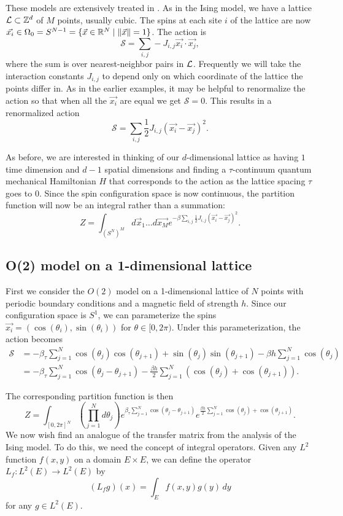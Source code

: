 \documentclass[11pt,reqno]{amsart}
\begin{document}
	These models are extensively treated in \cite{FradkinSusskind78,HamerKogutSusskind79,KogutGaugeSummary}. 
	As in the Ising model, we have a lattice $\mathcal{L} \subset \mathbb{Z}^d$ of $M$ points, usually cubic. 
	The spins at each site $i$ of the lattice are now $\vec{x_i} \in \Omega_0=S^{N-1} = \{\vec{x} \in \mathbb{R}^{N} \mid \|\vec{x}\|=1 \}$. 
	The action is
	\[\mathcal{S}=\sum_{i,j} -J_{i,j}\vec{x_i}\cdot\vec{x_j}, \] where the sum is over nearest-neighbor pairs in $\mathcal{L}$.
	Frequently we will take the interaction constants $J_{i,j}$ to depend only on which coordinate of the lattice the points differ in.
	As in the earlier examples, it may be helpful to renormalize the action so that when all the $\vec{x_i}$ are equal we get $\mathcal{S}=0$. 
	This results in a renormalized action
	\[\mathcal{S}=\sum_{i,j}\frac{1}{2} J_{i,j}(\vec{x_i}-\vec{x_j})^2. \]
	
	As before, we are interested in thinking of our $d$-dimensional lattice as having $1$ time dimension and $d-1$ spatial dimensions and finding a $\tau$-continuum quantum mechanical Hamiltonian $H$ that corresponds to the action as the lattice spacing $\tau$ goes to $0$.
	Since the spin configuration space is now continuous, the partition function will now be an integral rather than a summation:
	\[ Z=\int_{(S^N)^M} d\vec{x}_1\ldots d\vec{x_M} e^{-\beta\sum_{i,j}\frac{1}{2} J_{i,j}(\vec{x_i}-\vec{x_j})^2}. \]
	
	\subsection{O(2) model on a 1-dimensional lattice}
	
	First we consider the $O(2)$ model on a 1-dimensional lattice of $N$ points with periodic boundary conditions and a magnetic field of strength $h$.
	Since our configuration space is $S^1$, we can parameterize the spins $\vec{x_i}=(\cos(\theta_i),\sin(\theta_i))$ for $\theta \in [0,2\pi)$. 
	Under this parameterization, the action becomes
	\begin{align*}
		 \mathcal{S} &= -\beta_\tau \sum_{j=1}^N \cos(\theta_j)\cos(\theta_{j+1})+\sin(\theta_j)\sin(\theta_{j+1}) - \beta h  \sum_{j=1}^N \cos(\theta_j)\\
			&=  - \beta_\tau \sum_{j=1}^N \cos(\theta_j-\theta_{j+1}) - \frac{\beta h}{2}  \sum_{j=1}^N \left(\cos(\theta_j)+\cos(\theta_{j+1})\right). 
	\end{align*}
	
	The corresponding partition function is then
	\[ Z = \int_{[0,2\pi]^N} \left(\prod_{j=1}^N d\theta_j \right) e^{\beta_\tau \sum_{j=1}^N \cos(\theta_j-\theta_{j+1})} e^{\frac{\beta h}{2}  \sum_{j=1}^N \cos(\theta_j)+\cos(\theta_{j+1})}. \]
	We now wish find an analogue of the transfer matrix from the analysis of the Ising model.
	To do this, we need the concept of integral operators.
	Given any $L^2$ function $f(x,y)$ on a domain $E\times E$, we can define the operator $L_f : L^2(E) \to L^2(E)$ by 
	\[(L_f g)(x)=\int_E f(x,y)g(y)\, dy \]
	for any $g \in L^2(E)$.
	
\end{document}
